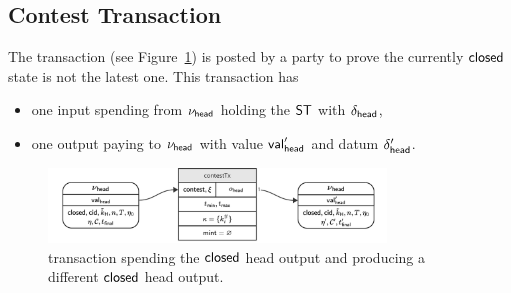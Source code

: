 \subsection{Contest Transaction}\label{sec:contest-tx}

The \mtxContest{} transaction (see Figure~\ref{fig:contestTx}) is posted by a
party to prove the currently $\mathsf{closed}$ state is not the latest one. This
transaction has
\begin{itemize}
	\item one input spending from $\nu_\mathsf{head}$ holding the $\mathsf{ST}$ with $\delta_{\mathsf{head}}$,
	\item one output paying to $\nu_\mathsf{head}$ with value $\mathsf{val}_{\mathsf{head}}'$ and
	      datum $\delta_{\mathsf{head}}'$.
\end{itemize}

\begin{figure}[h]
	\centering \includegraphics[width=0.8\textwidth]{figures/contestTx.pdf}
	\caption{\mtxContest{} transaction spending the $\mathsf{closed}$ head output and
		producing a different $\mathsf{closed}$ head output.}\label{fig:contestTx}
\end{figure}

